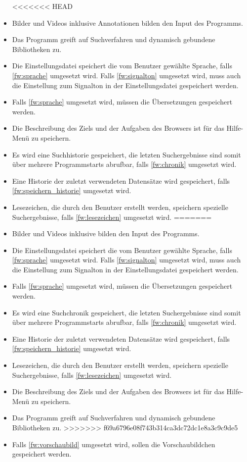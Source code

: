 \begin{itemize}
<<<<<<< HEAD
	\item Bilder und Videos inklusive Annotationen bilden den Input des Programms.
	\item Das Programm greift auf Suchverfahren und dynamisch gebundene Bibliotheken zu.
	\item Die Einstellungsdatei speichert die vom Benutzer gewählte Sprache, falls \ref{fw:sprache} umgesetzt wird. Falls \ref{fw:signalton} umgesetzt wird, muss auch die Einstellung zum Signalton in der Einstellungsdatei gespeichert werden.
	\item Falls \ref{fw:sprache} umgesetzt wird, müssen die Übersetzungen gespeichert werden.
	\item Die Beschreibung des Ziels und der Aufgaben des Browsers ist für das Hilfe-Menü zu speichern.
	\item Es wird eine Suchhistorie gespeichert, die letzten Suchergebnisse sind somit über mehrere Programmstarts abrufbar, falls \ref{fw:chronik} umgesetzt wird. 
	\item Eine Historie der zuletzt verwendeten Datensätze wird gespeichert, falls \ref{fw:speichern_historie} umgesetzt wird.
	\item Lesezeichen, die durch den Benutzer erstellt werden, speichern spezielle Suchergebnisse, falls \ref{fw:lesezeichen} umgesetzt wird.
=======
	\item Bilder und Videos inklusive  bilden den Input des Programms.
	\item Die Einstellungsdatei speichert die vom Benutzer gewählte Sprache, falls \ref{fw:sprache} umgesetzt wird. Falls \ref{fw:signalton} umgesetzt wird, muss auch die Einstellung zum Signalton in der Einstellungsdatei gespeichert werden.
	\item Falls \ref{fw:sprache} umgesetzt wird, müssen die Übersetzungen gespeichert werden.
	\item Es wird eine \gls{Suchchronik} gespeichert, die letzten Suchergebnisse sind somit über mehrere Programmstarts abrufbar, falls \ref{fw:chronik} umgesetzt wird. 
	\item Eine Historie der zuletzt verwendeten Datensätze wird gespeichert, falls \ref{fw:speichern_historie} umgesetzt wird.
	\item \gls{Lesezeichen}, die durch den Benutzer erstellt werden, speichern spezielle Suchergebnisse, falls \ref{fw:lesezeichen} umgesetzt wird.
	\item Die Beschreibung des Ziels und der Aufgaben des Browsers ist für das Hilfe-Menü zu speichern.
	\item Das Programm greift auf \gls{Suchverfahren} und dynamisch gebundene Bibliotheken zu.
>>>>>>> f69a6796e08f743b314ca3dc72dc1e8a3c9c9de5
	\item Falls \ref{fw:vorschaubild} umgesetzt wird, sollen die Vorschaubildchen gespeichert werden.
\end{itemize}
\pagebreak
